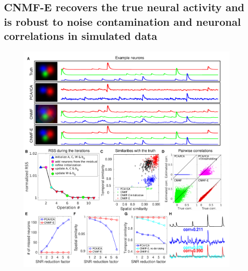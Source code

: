 \documentclass[9pt,lineno]{elife}
\begin{document}
\subsection{CNMF-E recovers the true neural activity and is robust to noise contamination and neuronal correlations in simulated data}
\begin{figure}[!t]
  \centering
  \includegraphics[width=1\textwidth]{Fig_SIM_part1.pdf}

\end{figure}
\end{document}
